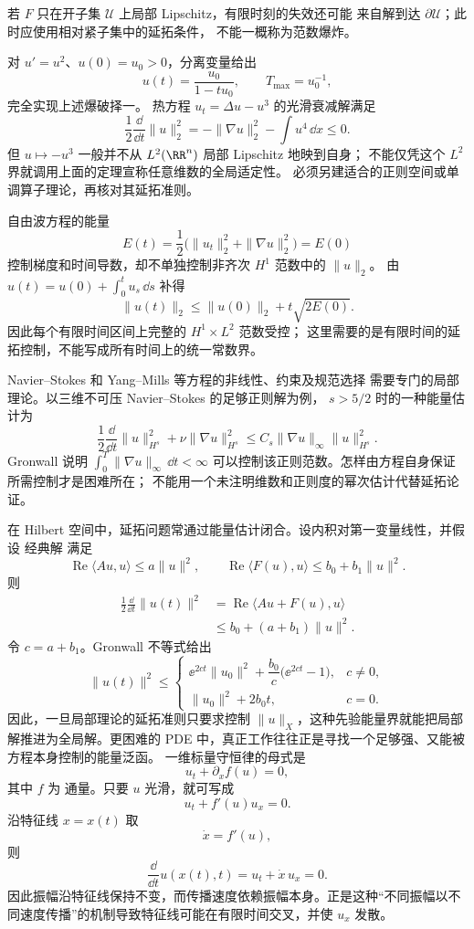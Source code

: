 若 $F$ 只在开子集 $\mathcal U$ 上局部 Lipschitz，有限时刻的失效还可能
来自解到达 $\partial\mathcal U$；此时应使用相对紧子集中的延拓条件，
不能一概称为范数爆炸。

\begin{example}
对 $u'=u^2$、$u(0)=u_0>0$，分离变量给出
\[
u(t)=\frac{u_0}{1-tu_0},\qquad T_{\max}=u_0^{-1},
\]
完全实现上述爆破择一。
热方程 $u_t=\Delta u-u^3$ 的光滑衰减解满足
\[
\frac12\frac{\dd}{\dd t}\|u\|_2^2
=-\|\nabla u\|_2^2-\int u^4\,\dd x\le0.
\]
但 $u\mapsto-u^3$ 一般并不从 $L^2(\RR^n)$ 局部 Lipschitz 地映到自身；
不能仅凭这个 $L^2$ 界就调用上面的定理宣称任意维数的全局适定性。
必须另建适合的正则空间或单调算子理论，再核对其延拓准则。

自由波方程的能量
\[
E(t)=\frac12\bigl(\|u_t\|_2^2+\|\nabla u\|_2^2\bigr)=E(0)
\]
控制梯度和时间导数，却不单独控制非齐次 $H^1$ 范数中的 $\|u\|_2$。
由 $u(t)=u(0)+\int_0^t u_s\,\dd s$ 补得
\[
\|u(t)\|_2\le\|u(0)\|_2+t\sqrt{2E(0)}.
\]
因此每个有限时间区间上完整的 $H^1\times L^2$ 范数受控；
这里需要的是有限时间的延拓控制，不能写成所有时间上的统一常数界。
\end{example}

\begin{note}[含导数的非线性]
Navier--Stokes 和 Yang--Mills 等方程的非线性、约束及规范选择
需要专门的局部理论。以三维不可压 Navier--Stokes 的足够正则解为例，
$s>5/2$ 时的一种能量估计为
\[
\frac12\frac{\dd}{\dd t}\|u\|_{H^s}^2
+\nu\|\nabla u\|_{H^s}^2
\le C_s\|\nabla u\|_\infty\|u\|_{H^s}^2.
\]
Gronwall 说明 $\int_0^T\|\nabla u\|_\infty\,\dd t<\infty$
可以控制该正则范数。怎样由方程自身保证所需控制才是困难所在；
不能用一个未注明维数和正则度的幂次估计代替延拓论证。
\end{note}

在 Hilbert 空间中，延拓问题常通过能量估计闭合。设内积对第一变量线性，并假设 经典解 满足
\[
\operatorname{Re}\langle Au,u\rangle
\le a\|u\|^2,
\qquad
\operatorname{Re}\langle F(u),u\rangle
\le b_0+b_1\|u\|^2.
\]
则
\[
\begin{aligned}
\frac12\frac{\dd}{\dd t}\|u(t)\|^2
&=\operatorname{Re}\langle Au+F(u),u\rangle\\
&\le b_0+(a+b_1)\|u\|^2.
\end{aligned}
\]
令 $c=a+b_1$。Gronwall 不等式给出
\begin{equation*}\|u(t)\|^2
\le
\begin{cases}
\ee^{2ct}\|u_0\|^2+
\dfrac{b_0}{c}\bigl(\ee^{2ct}-1\bigr),&c\ne0,\\[8pt]
\|u_0\|^2+2b_0t,&c=0.
\end{cases}\end{equation*}
因此，一旦局部理论的延拓准则只要求控制 $\|u\|_X$，这种先验能量界就能把局部解推进为全局解。更困难的 PDE 中，真正工作往往正是寻找一个足够强、又能被方程本身控制的能量泛函。
一维标量守恒律的母式是
\begin{equation*}u_t+\partial_x f(u)=0,\end{equation*}
其中 $f$ 为 通量。只要 $u$ 光滑，就可写成
\[
u_t+f'(u)u_x=0.
\]
沿特征线 $x=x(t)$ 取
\[
\dot x=f'(u),
\]
则
\[
\frac{\dd}{\dd t}u(x(t),t)
=u_t+\dot x\,u_x=0.
\]
因此振幅沿特征线保持不变，而传播速度依赖振幅本身。正是这种“不同振幅以不同速度传播”的机制导致特征线可能在有限时间交叉，并使 $u_x$ 发散。

